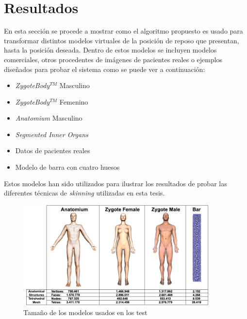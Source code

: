 \section{Resultados} 
\label{posing:result}

En esta sección se procede a mostrar como el algoritmo propuesto es usado para transformar distintos modelos virtuales de la posición de reposo que presentan, hasta la posición deseada. Dentro de estos modelos se incluyen modelos comerciales, otros procedentes de imágenes de pacientes reales o ejemplos diseñados para probar el sistema como se puede ver a continuación:
\begin{itemize}
    \item \emph{ZygoteBody}$^{TM}$ Masculino
    \item \emph{ZygoteBody}$^{TM}$ Femenino
    \item \emph{Anatomium} Masculino
    \item \emph{Segmented Inner Organs}\cite{VoxelMan}
    \item Datos de pacientes reales
    \item Modelo de barra con cuatro huesos
\end{itemize}

Estos modelos han sido utilizados para ilustrar los resultados de probar las diferentes técnicas de \emph{skinning} utilizadas en esta tesis. 

\begin{figure}[h]%
  \centering
  \includegraphics[width=0.90\textwidth]{IMG/models}
    \caption{Tamaño de los modelos usados en los test}
    \label{fig:models}
\end{figure}

